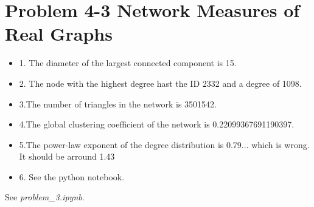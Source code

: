 \section{Problem 4-3 Network Measures of Real Graphs}
\begin{itemize}
\item 1. The diameter of the largest connected component is 15.
\item 2. The node with the highest degree hast the ID 2332 and a degree of 1098.
\item 3.The number of triangles in the network is 3501542.
\item 4.The global clustering coefficient of the network is 0.22099367691190397.
\item 5.The power-law exponent of the degree distribution is 0.79...  which is wrong.  It should be arround 1.43
\item 6.  See the python notebook.
\end{itemize}
See \textit{problem\_3.ipynb}.
